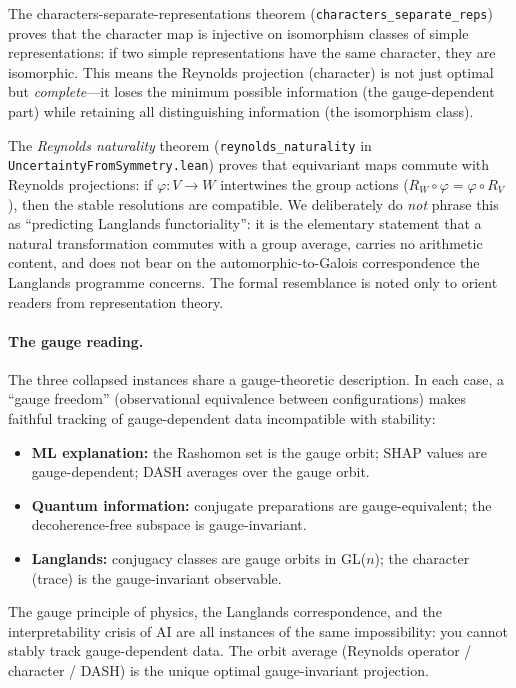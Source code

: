\documentclass[11pt,a4paper]{article}
\begin{document}
The characters-separate-representations theorem (\texttt{characters\_separate\_reps}) proves that the character map is injective on isomorphism classes of simple representations: if two simple representations have the same character, they are isomorphic.  This means the Reynolds projection (character) is not just optimal but \emph{complete}---it loses the minimum possible information (the gauge-dependent part) while retaining all distinguishing information (the isomorphism class).

The \emph{Reynolds naturality} theorem (\texttt{reynolds\_naturality} in \texttt{UncertaintyFromSymmetry.lean}) proves that equivariant maps commute with Reynolds projections: if $\varphi : V \to W$ intertwines the group actions ($R_W \circ \varphi = \varphi \circ R_V$), then the stable resolutions are compatible.  We deliberately do \emph{not} phrase this as ``predicting Langlands functoriality'': it is the elementary statement that a natural transformation commutes with a group average, carries no arithmetic content, and does not bear on the automorphic-to-Galois correspondence the Langlands programme concerns.  The formal resemblance is noted only to orient readers from representation theory.

\paragraph{The gauge reading.}
The three collapsed instances share a gauge-theoretic description.  In each case, a ``gauge freedom'' (observational equivalence between configurations) makes faithful tracking of gauge-dependent data incompatible with stability:
\begin{itemize}
  \item \textbf{ML explanation:} the Rashomon set is the gauge orbit; SHAP values are gauge-dependent; DASH averages over the gauge orbit.
  \item \textbf{Quantum information:} conjugate preparations are gauge-equivalent; the decoherence-free subspace is gauge-invariant.
  \item \textbf{Langlands:} conjugacy classes are gauge orbits in GL($n$); the character (trace) is the gauge-invariant observable.
\end{itemize}
The gauge principle of physics, the Langlands correspondence, and the interpretability crisis of AI are all instances of the same impossibility: you cannot stably track gauge-dependent data.  The orbit average (Reynolds operator / character / DASH) is the unique optimal gauge-invariant projection.
\end{document}

